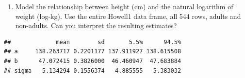 \documentclass[
]{book}
\newenvironment{Shaded}{\begin{snugshade}}{\end{snugshade}}
\newcommand{\CommentTok}[1]{\textcolor[rgb]{0.56,0.35,0.01}{\textit{#1}}}
\newcommand{\DataTypeTok}[1]{\textcolor[rgb]{0.13,0.29,0.53}{#1}}
\newcommand{\DecValTok}[1]{\textcolor[rgb]{0.00,0.00,0.81}{#1}}
\newcommand{\KeywordTok}[1]{\textcolor[rgb]{0.13,0.29,0.53}{\textbf{#1}}}
\newcommand{\NormalTok}[1]{#1}
\newcommand{\OperatorTok}[1]{\textcolor[rgb]{0.81,0.36,0.00}{\textbf{#1}}}
\newcommand{\StringTok}[1]{\textcolor[rgb]{0.31,0.60,0.02}{#1}}
\providecommand{\tightlist}{%
  \setlength{\itemsep}{0pt}\setlength{\parskip}{0pt}}
\begin{document}
\begin{enumerate}
\def\labelenumi{(\alph{enumi})}
\tightlist
\item
  Model the relationship between height (cm) and the natural logarithm of weight (log-kg). Use the entire Howell1 data frame, all 544 rows, adults and non-adults. Can you interpret the resulting estimates?
\end{enumerate}

\begin{Shaded}
\end{Shaded}

\begin{verbatim}
##             mean        sd       5.5%      94.5%
## a     138.263717 0.2201177 137.911927 138.615508
## b      47.072415 0.3826000  46.460947  47.683884
## sigma   5.134294 0.1556374   4.885555   5.383032
\end{verbatim}
\end{document}
